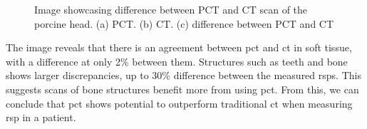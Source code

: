 \documentclass[main.tex]{subfiles}
\begin{document}
\begin{figure}[!ht]
    \caption{Image showcasing difference between PCT and CT scan of the porcine head. (a) PCT. (b) CT. (c) difference between PCT and CT \cite{porcine_2021}}
    \label{fig: porcine_pct_vs_ct}
\end{figure}
\FloatBarrier

The image reveals that there is an agreement between \gls{pct} and \gls{ct} in soft tissue, with a difference at only 2\% between them. Structures such as teeth and bone shows larger discrepancies, up to 30\% difference between the measured \gls{rsp}s. This suggests scans of bone structures benefit more from using \gls{pct}. From this, we can conclude that \gls{pct} shows potential to outperform traditional \gls{ct} when measuring \gls{rsp} in a patient.
\end{document}
